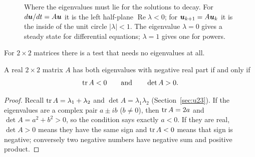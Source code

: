 \begin{figure}[ht]\centering
{}\qquad
{}
\caption{Where the eigenvalues must lie for the solutions to decay. For
$d\boldsymbol{u}/dt=A\boldsymbol{u}$ it is the left half-plane $\operatorname{Re}\lambda<0$; for
$\boldsymbol{u}_{k+1}=A\boldsymbol{u}_k$ it is the inside of the unit circle $|\lambda|<1$. The eigenvalue
$\lambda=0$ gives a steady state for differential equations; $\lambda=1$ gives one for powers.}
\label{fig:u25-regions}
\end{figure}

For $2\times2$ matrices there is a test that needs no eigenvalues at all.

\begin{proposition}\label{prop:u25-2by2}
A real $2\times2$ matrix $A$ has both eigenvalues with negative real part if and only if
\[
  \operatorname{tr} A<0\qquad\text{and}\qquad\det A>0 .
\]
\end{proposition}

\begin{proof}
Recall $\operatorname{tr} A=\lambda_1+\lambda_2$ and $\det A=\lambda_1\lambda_2$
(Section~\ref{sec:u23}). If the eigenvalues are a complex pair $a\pm ib$ ($b\neq0$),
then $\operatorname{tr} A=2a$ and $\det A=a^{2}+b^{2}>0$, so the condition says exactly $a<0$. If they are
real, $\det A>0$ means they have the same sign and $\operatorname{tr} A<0$ means that sign is negative;
conversely two negative numbers have negative sum and positive product.
\end{proof}

